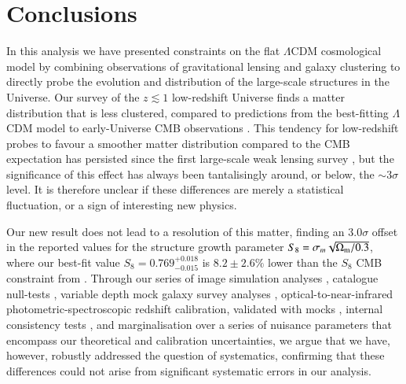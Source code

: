 \section{Conclusions}
\label{sec:conc}
In this analysis we have presented constraints on the flat $\Lambda$CDM cosmological model by combining observations of gravitational lensing and galaxy clustering to directly probe the evolution and distribution of the large-scale structures in the Universe.    Our survey of the $z \lesssim 1$ low-redshift Universe finds a matter distribution that is less clustered, compared to predictions from the best-fitting $\Lambda$CDM model to early-Universe CMB observations \citep{planck/etal:2018}.  This tendency for low-redshift probes to favour a smoother matter distribution compared to the CMB expectation has persisted since the first large-scale weak lensing survey \citep[CFHTLenS,][]{heymans/etal:2013}, but the significance of this effect has always been tantalisingly around, or below, the $\sim 3\sigma$ level.   It is therefore unclear if these differences are merely a statistical fluctuation, or a sign of interesting new physics.    

Our new result does not lead to a resolution of this matter, finding an $3.0\sigma$ offset in the reported values for the structure growth parameter $S_8 = \sigma_m \sqrt{\Omega_{\rm m}/0.3}$, where our best-fit value $S_8=0.769^{+0.018}_{-0.015}$ is $8.2 \pm 2.6\%$ lower than the $S_8$ CMB constraint from \citet{planck/etal:2018}.   Through our series of image simulation analyses \citep{kannawadi/etal:2019}, catalogue null-tests \citep{giblin/etal:inprep}, variable depth mock galaxy survey analyses \citep{joachimi/etal:inprep}, optical-to-near-infrared photometric-spectroscopic redshift calibration, validated with mocks \citep{wright/etal:2020, vandenbusch/etal:2020,hildebrandt/etal:inprep}, internal consistency tests \citep{asgari/etal:inprep}, and marginalisation over a series of nuisance parameters that encompass our theoretical and calibration uncertainties,  we argue that we have, however, robustly addressed the question of systematics, confirming that these differences could not arise from significant systematic errors in our analysis.

